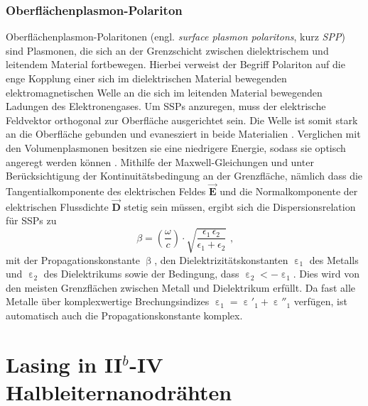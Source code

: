 \subsubsection{Oberflächenplasmon-Polariton}
Oberflächenplasmon-Polaritonen (engl. \textit{surface plasmon polaritons}, kurz \textit{SPP}) sind Plasmonen, die sich an der Grenzschicht zwischen dielektrischem und leitendem Material fortbewegen. Hierbei verweist der Begriff Polariton auf die enge Kopplung einer sich im dielektrischen Material bewegenden elektromagnetischen Welle an die sich im leitenden Material bewegenden Ladungen des Elektronengases. Um SSPs anzuregen, muss der elektrische Feldvektor orthogonal zur Oberfläche ausgerichtet sein. Die Welle ist somit stark an die Oberfläche gebunden und evanesziert in beide Materialien \cite{Roeder.Diss}.
Verglichen mit den Volumenplasmonen besitzen sie eine niedrigere Energie, sodass sie optisch angeregt werden können \cite{Maier.2010}.
Mithilfe der Maxwell-Gleichungen und unter Berücksichtigung der Kontinuitätsbedingung an der Grenzfläche, nämlich dass die Tangentialkomponente des elektrischen Feldes $\vec{\textbf{E}}$ und die Normalkomponente der elektrischen Flussdichte $\vec{\textbf{D}}$ stetig sein müssen, ergibt sich die Dispersionsrelation für SSPs zu
\begin{equation}
\beta=\left(\frac{\omega}{c}\right)\cdot \sqrt{\frac{\epsilon_1 \, \epsilon_2}{\epsilon_1+\epsilon_2}} \text{ ,}
\end{equation}
mit der Propagationskonstante $\upbeta$, den Dielektrizitätskonstanten $\upepsilon_\text{1}$ des Metalls und $\upepsilon_\text{2}$ des Dielektrikums sowie der Bedingung, dass $\upepsilon_\text{2}<-\upepsilon_\text{1}$. Dies wird von den meisten Grenzflächen zwischen Metall und Dielektrikum erfüllt. Da fast alle Metalle über komplexwertige Brechungsindizes $\upepsilon_\text{1}=\upepsilon'_\text{1}+\upepsilon''_\text{1}$ verfügen, ist automatisch auch die Propagationskonstante komplex.
\section{Lasing in II$^b$-IV Halbleiternanodrähten}
